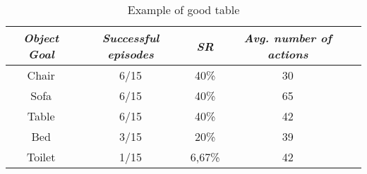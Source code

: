 \begin{table}[t]
    \centering
    \caption{Example of good table}
    \label{tab:vlv}
    \begin{tabular}{c|cccc}
        \toprule
        \textit{\textbf{Object Goal}} & \textit{\textbf{Successful episodes}} & \textit{\textbf{SR}} & \textit{\textbf{Avg. number of actions}} \\ \midrule
        Chair                         & 6/15                                  & 40\%                 & 30                                       \\
        Sofa                          & 6/15                                  & 40\%                 & 65                                       \\
        Table                         & 6/15                                  & 40\%                 & 42                                       \\
        Bed                           & 3/15                                  & 20\%                 & 39                                       \\
        Toilet                        & 1/15                                  & 6,67\%               & 42                                       \\ \bottomrule
    \end{tabular}
\end{table}